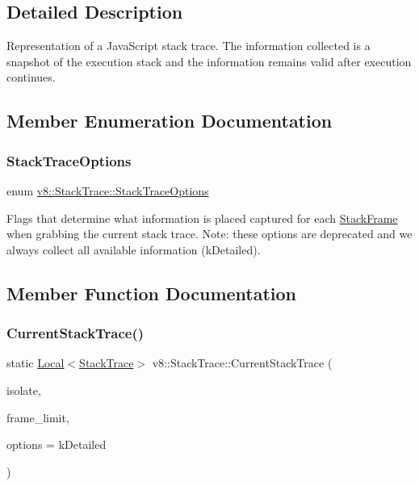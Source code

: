 \subsection{Detailed Description}
Representation of a Java\+Script stack trace. The information collected is a snapshot of the execution stack and the information remains valid after execution continues. 

\subsection{Member Enumeration Documentation}
\mbox{\label{classv8_1_1StackTrace_a9704e4a37949eb8eb8ccddbddf161492}} 
\subsubsection{\texorpdfstring{Stack\+Trace\+Options}{StackTraceOptions}}
{\footnotesize\ttfamily enum \mbox{\hyperlink{classv8_1_1StackTrace_a9704e4a37949eb8eb8ccddbddf161492}{v8\+::\+Stack\+Trace\+::\+Stack\+Trace\+Options}}}

Flags that determine what information is placed captured for each \mbox{\hyperlink{classv8_1_1StackFrame}{Stack\+Frame}} when grabbing the current stack trace. Note\+: these options are deprecated and we always collect all available information (k\+Detailed). 

\subsection{Member Function Documentation}
\mbox{\label{classv8_1_1StackTrace_a9ae3595dfa217d50a60cea7ea2e87366}} 
\subsubsection{\texorpdfstring{Current\+Stack\+Trace()}{CurrentStackTrace()}}
{\footnotesize\ttfamily static \mbox{\hyperlink{classv8_1_1Local}{Local}}$<$\mbox{\hyperlink{classv8_1_1StackTrace}{Stack\+Trace}}$>$ v8\+::\+Stack\+Trace\+::\+Current\+Stack\+Trace (\begin{DoxyParamCaption}\item[{\mbox{\hyperlink{classv8_1_1Isolate}{Isolate}} $\ast$}]{isolate,  }\item[{int}]{frame\+\_\+limit,  }\item[{\mbox{\hyperlink{classv8_1_1StackTrace_a9704e4a37949eb8eb8ccddbddf161492}{Stack\+Trace\+Options}}}]{options = {\ttfamily kDetailed} }\end{DoxyParamCaption})\hspace{0.3cm}{\ttfamily [static]}}

